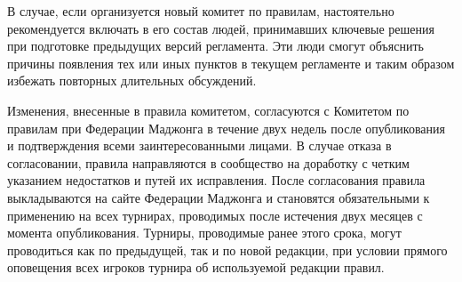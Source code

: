 В случае, если организуется новый комитет по правилам, настоятельно рекомендуется включать в его состав людей, принимавших ключевые решения при подготовке предыдущих версий регламента. Эти люди смогут объяснить причины появления тех или иных пунктов в текущем регламенте и таким образом избежать повторных длительных обсуждений.

Изменения, внесенные в правила комитетом, согласуются с Комитетом по правилам при Федерации Маджонга в течение двух недель после опубликования и подтверждения всеми заинтересованными лицами. В случае отказа в согласовании, правила направляются в сообщество на доработку с четким указанием недостатков и путей их исправления. После согласования правила выкладываются на сайте Федерации Маджонга и становятся обязательными к применению на всех турнирах, проводимых после истечения двух месяцев с момента опубликования. Турниры, проводимые ранее этого срока, могут проводиться как по предыдущей, так и по новой редакции, при условии прямого оповещения всех игроков турнира об используемой редакции правил.
